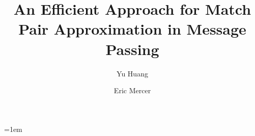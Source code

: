\documentclass[conference]{llncs}
\begin{document}
\title{An Efficient Approach for Match Pair Approximation in Message Passing}

\author{Yu Huang \and Eric Mercer}

\maketitle
%
%
\emergencystretch=1em


\begin{abstract} 

\end{abstract}









%







\end{document}
